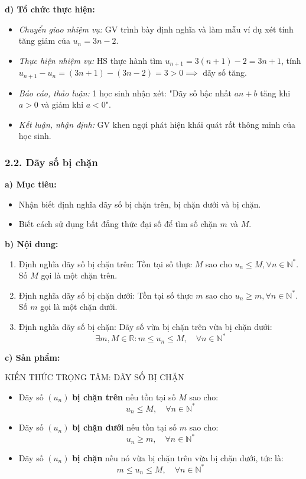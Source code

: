 \documentclass[12pt, a4paper]{article}
\begin{document}
\noindent \textbf{d) Tổ chức thực hiện:}  
\begin{itemize}[leftmargin=0.8cm]  
    \item \textit{Chuyển giao nhiệm vụ:} GV trình bày định nghĩa và làm mẫu ví dụ xét tính tăng giảm của $u_n = 3n - 2$.  
    \item \textit{Thực hiện nhiệm vụ:} HS thực hành tìm $u_{n+1} = 3(n + 1) - 2 = 3n + 1$, tính $u_{n+1} - u_n = (3n + 1) - (3n - 2) = 3 > 0 \implies$ dãy số tăng.  
    \item \textit{Báo cáo, thảo luận:} 1 học sinh nhận xét: "Dãy số bậc nhất $an + b$ tăng khi $a > 0$ và giảm khi $a < 0$".  
    \item \textit{Kết luận, nhận định:} GV khen ngợi phát hiện khái quát rất thông minh của học sinh.  
\end{itemize}  
  
\subsubsection*{2.2. Dãy số bị chặn}  
  
\noindent \textbf{a) Mục tiêu:}  
\begin{itemize}[leftmargin=0.8cm]  
    \item Nhận biết định nghĩa dãy số bị chặn trên, bị chặn dưới và bị chặn.  
    \item Biết cách sử dụng bất đẳng thức đại số để tìm số chặn $m$ và $M$.  
\end{itemize}  
  
\noindent \textbf{b) Nội dung:}  
\begin{enumerate}[leftmargin=0.6cm]  
    \item Định nghĩa dãy số bị chặn trên: Tồn tại số thực $M$ sao cho $u_n \le M, \forall n \in \mathbb{N}^*$. Số $M$ gọi là một chặn trên.  
    \item Định nghĩa dãy số bị chặn dưới: Tồn tại số thực $m$ sao cho $u_n \ge m, \forall n \in \mathbb{N}^*$. Số $m$ gọi là một chặn dưới.  
    \item Định nghĩa dãy số bị chặn: Dãy số vừa bị chặn trên vừa bị chặn dưới:  
    $$\exists m, M \in \mathbb{R}: m \le u_n \le M, \quad \forall n \in \mathbb{N}^*$$  
\end{enumerate}  
  
\noindent \textbf{c) Sản phẩm:}  
  
\begin{pedabox}{KIẾN THỨC TRỌNG TÂM: DÃY SỐ BỊ CHẶN}  
\begin{itemize}[leftmargin=0.6cm]  
    \item Dãy số $(u_n)$ \textbf{bị chặn trên} nếu tồn tại số $M$ sao cho:  
    $$u_n \le M, \quad \forall n \in \mathbb{N}^*$$  
    \item Dãy số $(u_n)$ \textbf{bị chặn dưới} nếu tồn tại số $m$ sao cho:  
    $$u_n \ge m, \quad \forall n \in \mathbb{N}^*$$  
    \item Dãy số $(u_n)$ \textbf{bị chặn} nếu nó vừa bị chặn trên vừa bị chặn dưới, tức là:  
    $$m \le u_n \le M, \quad \forall n \in \mathbb{N}^*$$  
\end{itemize}  
\end{pedabox}  
  
\end{document}

